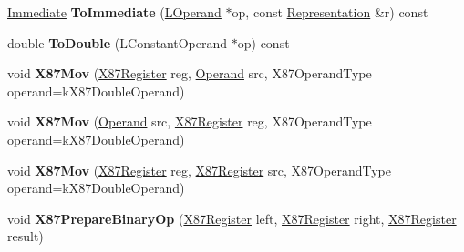\begin{DoxyCompactItemize}
\item 
\hyperlink{classv8_1_1internal_1_1_immediate}{Immediate} {\bfseries To\+Immediate} (\hyperlink{classv8_1_1internal_1_1_l_operand}{L\+Operand} $\ast$op, const \hyperlink{classv8_1_1internal_1_1_representation}{Representation} \&r) const \hypertarget{classv8_1_1internal_1_1_l_code_gen_a30d7456815ddc0dc136bd9a084aecc1b}{}\label{classv8_1_1internal_1_1_l_code_gen_a30d7456815ddc0dc136bd9a084aecc1b}

\item 
double {\bfseries To\+Double} (L\+Constant\+Operand $\ast$op) const \hypertarget{classv8_1_1internal_1_1_l_code_gen_a9859cf602181324ec10970ab93416aaa}{}\label{classv8_1_1internal_1_1_l_code_gen_a9859cf602181324ec10970ab93416aaa}

\item 
void {\bfseries X87\+Mov} (\hyperlink{structv8_1_1internal_1_1_double_register}{X87\+Register} reg, \hyperlink{classv8_1_1internal_1_1_operand}{Operand} src, X87\+Operand\+Type operand=k\+X87\+Double\+Operand)\hypertarget{classv8_1_1internal_1_1_l_code_gen_a4d8c206145a8523daac0398b015b40fd}{}\label{classv8_1_1internal_1_1_l_code_gen_a4d8c206145a8523daac0398b015b40fd}

\item 
void {\bfseries X87\+Mov} (\hyperlink{classv8_1_1internal_1_1_operand}{Operand} src, \hyperlink{structv8_1_1internal_1_1_double_register}{X87\+Register} reg, X87\+Operand\+Type operand=k\+X87\+Double\+Operand)\hypertarget{classv8_1_1internal_1_1_l_code_gen_ac5585789ef7043a0b6d26e0667de496f}{}\label{classv8_1_1internal_1_1_l_code_gen_ac5585789ef7043a0b6d26e0667de496f}

\item 
void {\bfseries X87\+Mov} (\hyperlink{structv8_1_1internal_1_1_double_register}{X87\+Register} reg, \hyperlink{structv8_1_1internal_1_1_double_register}{X87\+Register} src, X87\+Operand\+Type operand=k\+X87\+Double\+Operand)\hypertarget{classv8_1_1internal_1_1_l_code_gen_a3b7bf56528b76784095bf3019bf61a51}{}\label{classv8_1_1internal_1_1_l_code_gen_a3b7bf56528b76784095bf3019bf61a51}

\item 
void {\bfseries X87\+Prepare\+Binary\+Op} (\hyperlink{structv8_1_1internal_1_1_double_register}{X87\+Register} left, \hyperlink{structv8_1_1internal_1_1_double_register}{X87\+Register} right, \hyperlink{structv8_1_1internal_1_1_double_register}{X87\+Register} result)\hypertarget{classv8_1_1internal_1_1_l_code_gen_a0763ae3c5ff3c3a32fe80a504bef9434}{}\label{classv8_1_1internal_1_1_l_code_gen_a0763ae3c5ff3c3a32fe80a504bef9434}


\end{DoxyCompactItemize}
